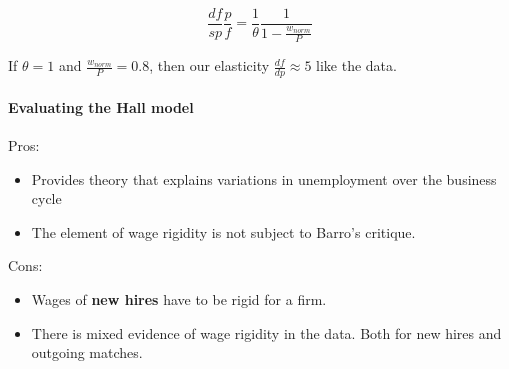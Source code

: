 \documentclass[11pt]{article}
\begin{document}
\[\dfrac{df}{sp}\dfrac{p}{f} = \dfrac{1}{\theta}\dfrac{1}{1-\frac{w_{norm}}{P}}\]

If $\theta=1$ and $\frac{w_{norm}}{P}=0.8$, then our elasticity $\frac{df}{dp}\approx 5$ like the data.


\begin{shaded}
\paragraph{Evaluating the Hall model} \mbox{}

Pros:
\begin{itemize}
\item Provides theory that explains variations in unemployment over the business cycle
\item The element of wage rigidity is not subject to Barro's critique.
\end{itemize}

Cons:
\begin{itemize}
\item Wages of \textbf{new hires} have to be rigid for a firm.
\item There is mixed evidence of wage rigidity in the data. Both for new hires and outgoing matches.
\end{itemize}

\end{shaded}
\end{document}
